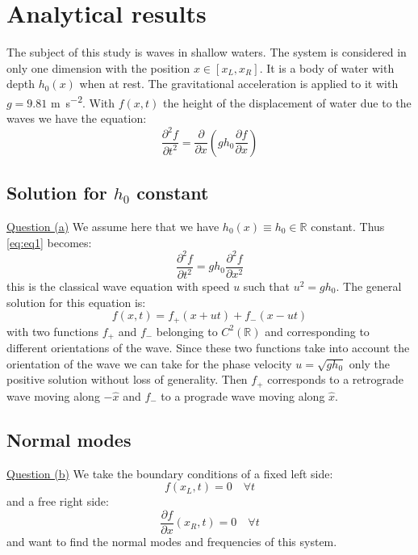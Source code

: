\section{Analytical results}
The subject of this study is waves in shallow waters. The system is considered in only one dimension with the position $x \in [x_L, x_R]$. It is a body of water with depth $h_0(x)$ when at rest. The gravitational acceleration is applied to it with $g = 9.81$ \si{\meter\per\square\second}. With $f(x,t)$ the height of the displacement of water due to the waves we have the equation:
\begin{equation}
    \frac{\partial^2 f}{\partial t^2} = \frac{\partial}{\partial x} \left( g h_0 \frac{\partial f}{\partial x} \right)
    \label{eq:eq1}
\end{equation}

\subsection{Solution for $h_0$ constant}
\underline{Question (a)}
We assume here that we have $h_0(x) \equiv h_0 \in \mathbb{R}$ constant. Thus \autoref{eq:eq1} becomes:
\begin{equation}
    \frac{\partial^2 f}{\partial t^2} = g h_0 \frac{\partial^2 f}{\partial x^2}
    \label{eq:eq_h0_const}
\end{equation}
this is the classical wave equation with speed $u$ such that $u^2 = gh_0$. The general solution for this equation is:
\begin{equation}
    f(x,t) = f_+(x+ut) + f_-(x-ut)
    \label{eq:general_solution}
\end{equation}
with two functions $f_+$ and $f_-$ belonging to $C^2(\mathbb{R})$ and corresponding to different orientations of the wave. Since these two functions take into account the orientation of the wave we can take for the phase velocity $u = \sqrt{gh_0}$ only the positive solution without loss of generality. Then $f_+$ corresponds to a retrograde wave moving along $-\hat{x}$ and $f_-$ to a prograde wave moving along $\hat{x}$.

\subsection{Normal modes}
\label{sec:normal_modes}
\underline{Question (b)}
We take the boundary conditions of a fixed left side:
\begin{equation}
    f(x_L, t) = 0 \quad \forall t
    \label{eq:condition_left}
\end{equation}
and a free right side:
\begin{equation}
    \frac{\partial f}{\partial x}(x_R,t) = 0 \quad \forall t
    \label{eq:condition_right}
\end{equation}
and want to find the normal modes and frequencies of this system.

